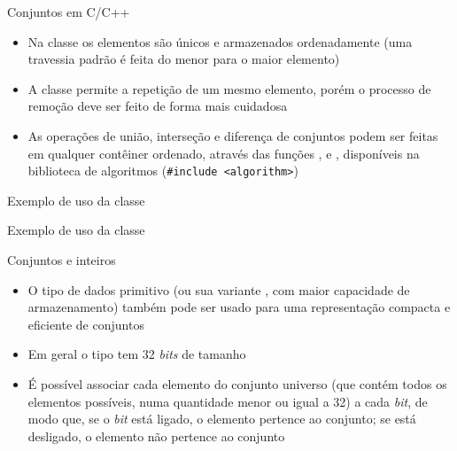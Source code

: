 \begin{frame}[fragile]{Conjuntos em C/C++}

    \begin{itemize}
        \item Na classe  os elementos são únicos e armazenados ordenadamente (uma travessia padrão é feita do menor para o maior elemento)

        \item A classe  permite a repetição de um mesmo elemento, porém o processo de remoção deve ser feito de forma mais cuidadosa

        \item As operações de união, interseção e diferença de conjuntos podem ser feitas em qualquer contêiner ordenado, através das funções
            ,  e , disponíveis na biblioteca de algoritmos
            (\texttt{#include <algorithm>})
    \end{itemize}

\end{frame}

\begin{frame}[fragile]{Exemplo de uso da classe }
\end{frame}

\begin{frame}[fragile]{Exemplo de uso da classe }
\end{frame}

\begin{frame}[fragile]{Conjuntos e inteiros}

    \begin{itemize}
        \item O tipo de dados primitivo  (ou sua variante , com maior capacidade de armazenamento) também pode ser usado para
            uma representação compacta e eficiente de conjuntos

        \item Em geral o tipo  tem 32 \textit{bits} de tamanho

        \item É possível associar cada elemento do conjunto universo (que contém todos os elementos possíveis, numa quantidade menor ou igual a 32) a cada 
            \textit{bit}, de modo que, se o \textit{bit} está ligado, o elemento pertence ao conjunto; se está desligado, o elemento não pertence ao conjunto
    \end{itemize}

\end{frame}

